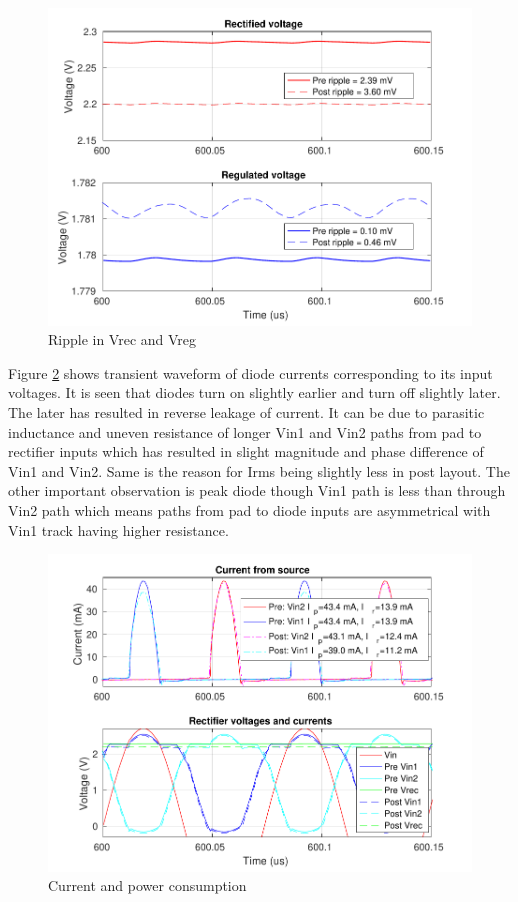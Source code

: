 \documentclass[UKenglish]{ifimaster}  %
\begin{document}
\begin{figure} [H]
  \centering
  \includegraphics[width=\textwidth]{img/pms/pms2_ripple_both.pdf} 
 \caption{Ripple in Vrec and Vreg} 
\label{fig:pms_ripple} 
\end{figure}

Figure \ref{fig:pms_PI} shows transient waveform of diode currents corresponding to its input voltages. It is seen that diodes turn on slightly earlier and turn off slightly later. 
The later has resulted in reverse leakage of current. It can be due to parasitic inductance and uneven resistance of 
longer Vin1 and Vin2 paths from pad to rectifier inputs which has resulted in slight magnitude and phase difference of 
Vin1 and Vin2. Same is the reason for Irms being slightly less in post layout. The other important observation is peak diode though Vin1 path is 
less than through Vin2 path which means paths from pad to diode inputs are asymmetrical with Vin1 track having higher resistance.\\


\begin{figure} [H]
  \centering
  \includegraphics[width=\textwidth]{img/pms/pms2_VIrect_both.pdf} 
 \caption{Current and power consumption} 
\label{fig:pms_PI} 
\end{figure}
\end{document}
